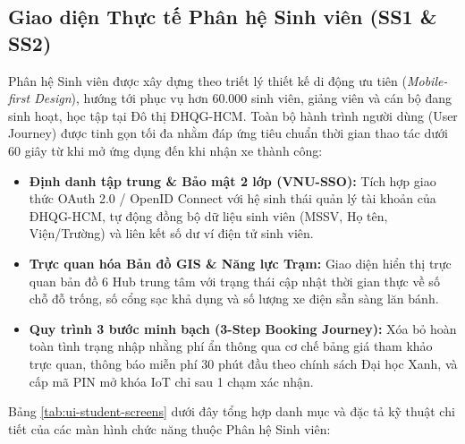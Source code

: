\documentclass[12pt,a4paper]{article}
\begin{document}
\clearpage
\clearpage
\subsection{Giao diện Thực tế Phân hệ Sinh viên (SS1 \& SS2)}
Phân hệ Sinh viên được xây dựng theo triết lý thiết kế di động ưu tiên (\textit{Mobile-first Design}), hướng tới phục vụ hơn $60.000$ sinh viên, giảng viên và cán bộ đang sinh hoạt, học tập tại Đô thị ĐHQG-HCM. Toàn bộ hành trình người dùng (User Journey) được tinh gọn tối đa nhằm đáp ứng tiêu chuẩn thời gian thao tác dưới 60 giây từ khi mở ứng dụng đến khi nhận xe thành công:
\begin{itemize}[nosep]
    \item \textbf{Định danh tập trung \& Bảo mật 2 lớp (VNU-SSO):} Tích hợp giao thức OAuth 2.0 / OpenID Connect với hệ sinh thái quản lý tài khoản của ĐHQG-HCM, tự động đồng bộ dữ liệu sinh viên (MSSV, Họ tên, Viện/Trường) và liên kết số dư ví điện tử sinh viên.
    \item \textbf{Trực quan hóa Bản đồ GIS \& Năng lực Trạm:} Giao diện hiển thị trực quan bản đồ 6 Hub trung tâm với trạng thái cập nhật thời gian thực về số chỗ đỗ trống, số cổng sạc khả dụng và số lượng xe điện sẵn sàng lăn bánh.
    \item \textbf{Quy trình 3 bước minh bạch (3-Step Booking Journey):} Xóa bỏ hoàn toàn tình trạng nhập nhằng phí ẩn thông qua cơ chế bảng giá tham khảo trực quan, thông báo miễn phí 30 phút đầu theo chính sách Đại học Xanh, và cấp mã PIN mở khóa IoT chỉ sau 1 chạm xác nhận.
\end{itemize}

Bảng \ref{tab:ui-student-screens} dưới đây tổng hợp danh mục và đặc tả kỹ thuật chi tiết của các màn hình chức năng thuộc Phân hệ Sinh viên:
\end{document}
